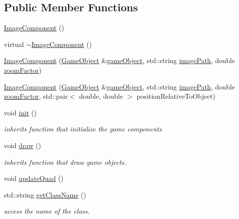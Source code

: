 \subsection*{Public Member Functions}
\begin{DoxyCompactItemize}
\item 
\hyperlink{classengine_1_1_image_component_a23b36883184415e68d4da77e06b10bf3}{Image\+Component} ()
\item 
virtual \hyperlink{classengine_1_1_image_component_a80d6f915909d151df0c785b803f1aafa}{$\sim$\+Image\+Component} ()
\item 
\hyperlink{classengine_1_1_image_component_ab6d7f27c64158fbea6ec71704abbf4ea}{Image\+Component} (\hyperlink{classengine_1_1_game_object}{Game\+Object} \&\hyperlink{classengine_1_1_component_ad4a4865ca4df98ebea34d04a4ec5ad07}{game\+Object}, std\+::string \hyperlink{classengine_1_1_background_component_aeffcb1aa8b67444e004413dee8c266b1}{image\+Path}, double \hyperlink{classengine_1_1_image_component_aa27852286227a84dc9c9f01c9fe2add8}{zoom\+Factor})
\item 
\hyperlink{classengine_1_1_image_component_acf18f670b8d344df162a50f76032ecfa}{Image\+Component} (\hyperlink{classengine_1_1_game_object}{Game\+Object} \&\hyperlink{classengine_1_1_component_ad4a4865ca4df98ebea34d04a4ec5ad07}{game\+Object}, std\+::string \hyperlink{classengine_1_1_background_component_aeffcb1aa8b67444e004413dee8c266b1}{image\+Path}, double \hyperlink{classengine_1_1_image_component_aa27852286227a84dc9c9f01c9fe2add8}{zoom\+Factor}, std\+::pair$<$ double, double $>$ position\+Relative\+To\+Object)
\item 
void \hyperlink{classengine_1_1_image_component_a4e5def28ca4647b29a4fe9bda78f9e57}{init} ()
\begin{DoxyCompactList}\small\item\em inherits function that initialize the game components \end{DoxyCompactList}\item 
void \hyperlink{classengine_1_1_image_component_a2be1a46da22f0f2280f7748c49fa6276}{draw} ()
\begin{DoxyCompactList}\small\item\em inherits function that draw game objects. \end{DoxyCompactList}\item 
void \hyperlink{classengine_1_1_image_component_ae821d9ce91c9cb6235b80d5ef248516b}{update\+Quad} ()
\item 
std\+::string \hyperlink{classengine_1_1_image_component_ac18bc924683d4d389b6706abd0afab20}{get\+Class\+Name} ()
\begin{DoxyCompactList}\small\item\em access the name of the class. \end{DoxyCompactList}\end{DoxyCompactItemize}

